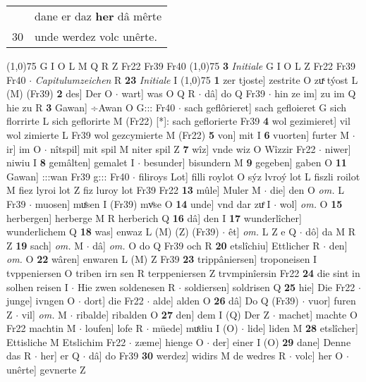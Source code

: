 \documentclass[8pt,a4paper,notitlepage]{article}
\begin{document}
\begin{table}[ht]
\begin{minipage}[t]{0.5\linewidth}
\begin{tabular}{rl}
 & dane er daz \textbf{her} dâ mêrte\\ 
30 & unde werdez volc unêrte.\\ 
\end{tabular}
\scriptsize
\line(1,0){75} \newline
G I O L M Q R Z Fr22 Fr39 Fr40 \newline
\line(1,0){75} \newline
\textbf{3} \textit{Initiale} G I O L Z Fr22 Fr39 Fr40   $\cdot$ \textit{Capitulumzeichen} R  \textbf{23} \textit{Initiale} I  \newline
\line(1,0){75} \newline
\textbf{1} zer tjoste] zestrite O zuͯ týost L (M) (Fr39) \textbf{2} des] Der O  $\cdot$ wart] was O Q R  $\cdot$ dâ] do Q Fr39  $\cdot$ hin ze im] zu im Q hie zu R \textbf{3} Gawan] ÷Awan O G::: Fr40  $\cdot$ sach geflôrieret] sach gefloieret G sich florrirte L sich geflorirte M (Fr22) [*]: sach geflorierte  Fr39 \textbf{4} wol gezimieret] vil wol zimierte L Fr39 wol gezcymierte M (Fr22) \textbf{5} von] mit I \textbf{6} vuorten] furter M  $\cdot$ ir] im O  $\cdot$ nîtspil] mit spil M niter spil Z \textbf{7} wîz] vnde wiz O Wîzzir Fr22  $\cdot$ niwer] niwiu I \textbf{8} gemâlten] gemalet I  $\cdot$ besunder] bisundern M \textbf{9} gegeben] gaben O \textbf{11} Gawan] :::wan Fr39 g::: Fr40  $\cdot$ filiroys Lot] filli roylot O sýz lvroý lot L fiszli roilot M fiez lyroi lot Z fiz luroy lot Fr39 Fr22 \textbf{13} mûle] Muler M  $\cdot$ die] den O \textit{om.} L Fr39  $\cdot$ muosen] muͤsen I (Fr39) mvͦse O \textbf{14} unde] vnd dar zuͤ I  $\cdot$ wol] \textit{om.} O \textbf{15} herbergen] herberge M R herberich Q \textbf{16} dâ] den I \textbf{17} wunderlîcher] wunderlichem Q \textbf{18} was] enwaz L (M) (Z) (Fr39)  $\cdot$ êt] \textit{om.} L Z e Q  $\cdot$ dô] da M R Z \textbf{19} sach] \textit{om.} M  $\cdot$ dâ] \textit{om.} O do Q Fr39 och R \textbf{20} etslîchiu] Ettlicher R  $\cdot$ den] \textit{om.} O \textbf{22} wâren] enwaren L (M) Z Fr39 \textbf{23} trippâniersen] troponeisen I tvppeniersen O triben irn sen R terppeniersen Z trvmpinîersin Fr22 \textbf{24} die sint in solhen reisen I  $\cdot$ Hie zwen soldenesen R  $\cdot$ soldiersen] soldrisen Q \textbf{25} hie] Die Fr22  $\cdot$ junge] ivngen O  $\cdot$ dort] die Fr22  $\cdot$ alde] alden O \textbf{26} dâ] Do Q (Fr39)  $\cdot$ vuor] furen Z  $\cdot$ vil] \textit{om.} M  $\cdot$ ribalde] ribalden O \textbf{27} den] dem I (Q) Der Z  $\cdot$ machet] machte O Fr22 machtin M  $\cdot$ loufen] lofe R  $\cdot$ müede] muͤdiu I (O)  $\cdot$ lide] liden M \textbf{28} etslîcher] Ettisliche M Etslichim Fr22  $\cdot$ zæme] hienge O  $\cdot$ der] einer I (O) \textbf{29} dane] Denne das R  $\cdot$ her] er Q  $\cdot$ dâ] do Fr39 \textbf{30} werdez] widirs M de wedres R  $\cdot$ volc] her O  $\cdot$ unêrte] gevnerte Z \newline

\end{minipage}
\end{table}
\end{document}
